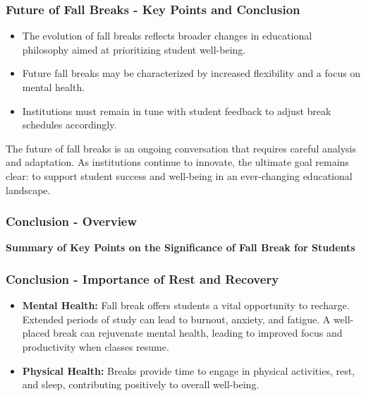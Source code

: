 \documentclass[aspectratio=169]{beamer}
\begin{document}
\begin{frame}[fragile]
    \frametitle{Future of Fall Breaks - Key Points and Conclusion}
    \begin{itemize}
        \item The evolution of fall breaks reflects broader changes in educational philosophy aimed at prioritizing student well-being.
        \item Future fall breaks may be characterized by increased flexibility and a focus on mental health.
        \item Institutions must remain in tune with student feedback to adjust break schedules accordingly.
    \end{itemize}

    The future of fall breaks is an ongoing conversation that requires careful analysis and adaptation. As institutions continue to innovate, the ultimate goal remains clear: to support student success and well-being in an ever-changing educational landscape.
\end{frame}

\begin{frame}[fragile]
    \frametitle{Conclusion - Overview}
    \textbf{Summary of Key Points on the Significance of Fall Break for Students}
\end{frame}

\begin{frame}[fragile]
    \frametitle{Conclusion - Importance of Rest and Recovery}
    \begin{itemize}
        \item \textbf{Mental Health:} Fall break offers students a vital opportunity to recharge. Extended periods of study can lead to burnout, anxiety, and fatigue. A well-placed break can rejuvenate mental health, leading to improved focus and productivity when classes resume.
        \item \textbf{Physical Health:} Breaks provide time to engage in physical activities, rest, and sleep, contributing positively to overall well-being.
    \end{itemize}
\end{frame}
\end{document}
